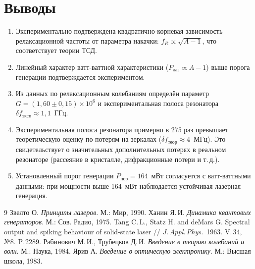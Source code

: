 \documentclass[12pt,a4paper]{article}
\begin{document}
\section{Выводы}

\begin{enumerate}
  \item Экспериментально подтверждена квадратично-корневая зависимость
    релаксационной частоты от параметра накачки:
    $f_R \propto \sqrt{A-1}$, что соответствует теории ТСД.

  \item Линейный характер ватт-ваттной характеристики ($P_\text{лаз} \propto A-1$)
    выше порога генерации подтверждается экспериментом.

  \item Из данных по релаксационным колебаниям определён параметр
    $G = (1{,}60 \pm 0{,}15)\times10^6$ и экспериментальная полоса
    резонатора $\delta f_\text{эксп} \approx 1{,}1$~ГГц.

  \item Экспериментальная полоса резонатора примерно в 275 раз превышает
    теоретическую оценку по потерям на зеркалах ($\delta f_\text{теор} \approx 4$~МГц).
    Это свидетельствует о значительных дополнительных потерях в реальном
    резонаторе (рассеяние в кристалле, дифракционные потери и т.\,д.).

  \item Установленный порог генерации $P_\text{пор} = 164$~мВт согласуется
    с ватт-ваттными данными: при мощности выше 164~мВт наблюдается
    устойчивая лазерная генерация.
\end{enumerate}

\begin{thebibliography}{9}
   Звелто О. \textit{Принципы лазеров}. М.: Мир, 1990.
   Ханин Я.\,И. \textit{Динамика квантовых генераторов}. М.: Сов. Радио, 1975.
   Tang C.\,L., Statz H. and deMars G. Spectral output and spiking
    behaviour of solid-state laser // \textit{J.\,Appl.\,Phys.}\ 1963. V.\,34, №8. P.\,2289.
   Рабинович М.\,И., Трубецков Д.\,И. \textit{Введение в теорию
    колебаний и волн}. М.: Наука, 1984.
   Ярив А. \textit{Введение в оптическую электронику}. М.: Высшая школа, 1983.
\end{thebibliography}

\appendix
\end{document}
